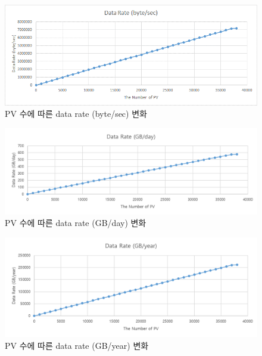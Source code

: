 \documentclass[11pt
  , a4paper
  , article
  , oneside
]{memoir}
\begin{document}
\begin{figure}[h!]
	\centering
	\includegraphics[width=1\textwidth, height=0.3\textheight]{./images/sec1.png}
	\caption{PV 수에 따른 data rate (byte/sec) 변화}
\end{figure}
\clearpage
\begin{figure}[h!]
	\centering
	\includegraphics[width=1\textwidth, height=0.3\textheight]{./images/day1.png}
	\caption{PV 수에 따른 data rate (GB/day) 변화}
\end{figure}
\begin{figure}[h!]
	\centering
	\includegraphics[width=1\textwidth, height=0.3\textheight]{./images/year1.png}
	\caption{PV 수에 따른 data rate (GB/year) 변화}
\end{figure}
\end{document}

